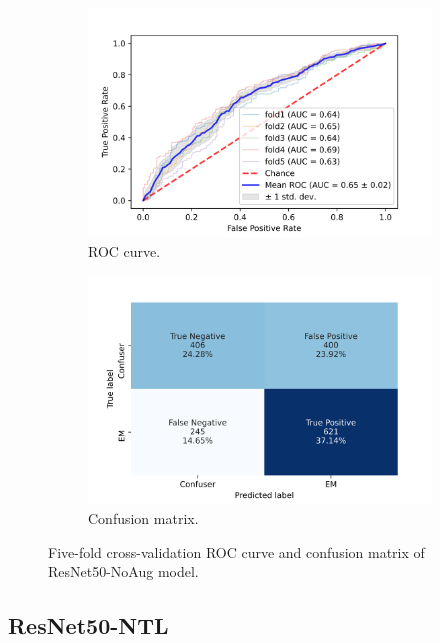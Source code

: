 \begin{figure}[h!]
	\centering
	\begin{subfigure}[b]{0.49\textwidth}
		\centering
		\includegraphics[width=\textwidth,keepaspectratio]{images/Supplement4/image21.png}
		\caption{ROC curve.}
	\end{subfigure}
	\hfill
	\begin{subfigure}[b]{0.49\textwidth}
		\centering
		\includegraphics[width=\textwidth,keepaspectratio]{images/Supplement4/image27.png}
		\caption{Confusion matrix.}
	\end{subfigure}
	\caption{Five-fold cross-validation ROC curve and confusion matrix of ResNet50-NoAug model.}
\end{figure}

\vfill\clearpage
\subsection{ResNet50-NTL}

